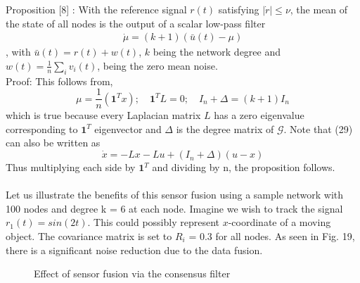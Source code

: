 \documentclass[journal]{IEEEtran}
\begin{document}
Proposition [8] : With the reference signal $r(t)$ satisfying $|\dot{r}| \leq \nu$, the mean of the state of all nodes is the output of a scalar low-pass filter \begin{align} \dot{\mu} = (k+1)(\bar{u}(t)-\mu)\end{align}, with $\bar{u}(t) = r(t)+w(t)$, $k$ being the network degree and $w(t) = \frac{1}{n}\sum_{i}v_i(t)$, being the zero mean noise.\\ Proof: This follows from, $$ \mu = \frac{1}{n}(\textbf{1}^Tx);\quad \textbf{1}^TL = 0;\quad  I_n+\Delta = (k+1)I_n$$ which is true because every Laplacian matrix $L$ has a zero eigenvalue corresponding to $\textbf{1}^T$ eigenvector and $\Delta$ is the degree matrix of $\mathcal{G}$. Note that (29) can also be written as $$ \dot{x} = -Lx-Lu+(I_n+\Delta)(u-x)$$Thus multiplying each side by $\textbf{1}^T$ and dividing by n, the proposition follows. \\\\ Let us illustrate the benefits of this sensor fusion using a sample network with 100 nodes and degree k = 6 at each node. Imagine we wish to track the signal $r_1(t) = sin(2t)$. This could possibly represent $x$-coordinate of a moving object. The covariance matrix is set to $R_i$ = 0.3 for all nodes. As seen in Fig. 19, there is a significant noise reduction due to the data fusion. 
\begin{figure}[h]
\caption{Effect of sensor fusion via the consensus filter} \end{figure}
\end{document}
